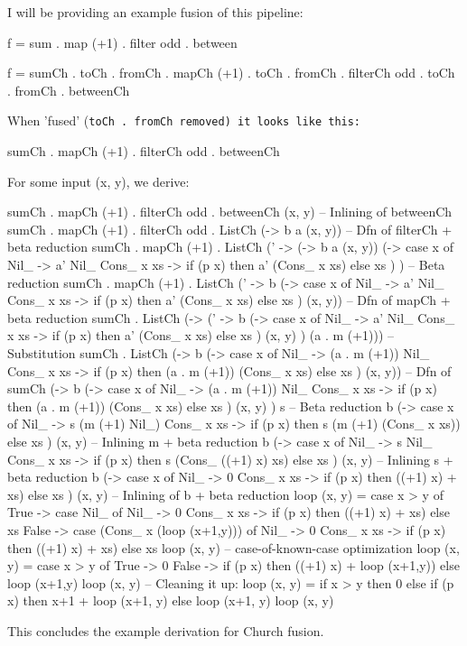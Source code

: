 I will be providing an example fusion of this pipeline:
\begin{spec}
f = sum . map (+1) . filter odd . between

f =	     sumCh        . toCh .
fromCh . mapCh (+1)   . toCh .
fromCh . filterCh odd . toCh .
fromCh . betweenCh
\end{spec}
When 'fused' (\tt{toCh . fromCh} removed) it looks like this:
\begin{spec}
sumCh . mapCh (+1) . filterCh odd . betweenCh
\end{spec}
For some input (x, y), we derive:
\begin{spec}
sumCh . mapCh (+1) . filterCh odd . betweenCh (x, y)
-- Inlining of betweenCh
sumCh . mapCh (+1) . filterCh odd . ListCh (\a -> b a (x, y))
-- Dfn of filterCh + beta reduction
sumCh . mapCh (+1) .
  ListCh (\a' ->
    (\a -> b a (x, y))
	(\x -> case x of
      Nil_ -> a' Nil_
      Cons_ x xs -> if (p x) then a' (Cons_ x xs) else xs
    )
  )
-- Beta reduction
sumCh . mapCh (+1) .
  ListCh (\a' ->
    b (\x -> case x of
      Nil_ -> a' Nil_
      Cons_ x xs -> if (p x) then a' (Cons_ x xs) else xs
    )
	(x, y))
-- Dfn of mapCh + beta reduction
sumCh . ListCh (\a ->
  (\a' ->
    b (\x -> case x of
      Nil_ -> a' Nil_
      Cons_ x xs -> if (p x) then a' (Cons_ x xs) else xs
    )
	(x, y)
  )
  (a . m (+1)))
-- Substitution
sumCh . ListCh (\a ->
  b (\x -> case x of
    Nil_ -> (a . m (+1)) Nil_
    Cons_ x xs -> if (p x) then (a . m (+1)) (Cons_ x xs) else xs
  )
  (x, y))
-- Dfn of sumCh
(\a ->
  b (\x -> case x of
    Nil_ -> (a . m (+1)) Nil_
    Cons_ x xs -> if (p x) then (a . m (+1)) (Cons_ x xs) else xs
  )
  (x, y)
) s
-- Beta reduction
b (\x -> case x of
  Nil_ -> s (m (+1) Nil_)
  Cons_ x xs -> if (p x) then s (m (+1) (Cons_ x xs)) else xs
) (x, y)
-- Inlining m + beta reduction
b (\x -> case x of
  Nil_ -> s Nil_
  Cons_ x xs -> if (p x) then s (Cons_ ((+1) x) xs) else xs
) (x, y)
-- Inlining s + beta reduction
b (\x -> case x of
  Nil_ -> 0
  Cons_ x xs -> if (p x) then ((+1) x) + xs) else xs
) (x, y)
-- Inlining of b + beta reduction
loop (x, y) = case x > y of
  True -> case Nil_ of
    Nil_ -> 0
    Cons_ x xs -> if (p x) then ((+1) x) + xs) else xs
  False -> case (Cons_ x (loop (x+1,y))) of
    Nil_ -> 0
    Cons_ x xs -> if (p x) then ((+1) x) + xs) else xs
loop (x, y)
-- case-of-known-case optimization
loop (x, y) = case x > y of
  True -> 0
  False -> if (p x) then ((+1) x) + loop (x+1,y)) else loop (x+1,y)
loop (x, y)
-- Cleaning it up:
loop (x, y) = if x > y 
              then 0
              else if (p x)
                   then x+1 + loop (x+1, y)
		               else loop (x+1, y)
loop (x, y)
\end{spec}
This concludes the example derivation for Church fusion.